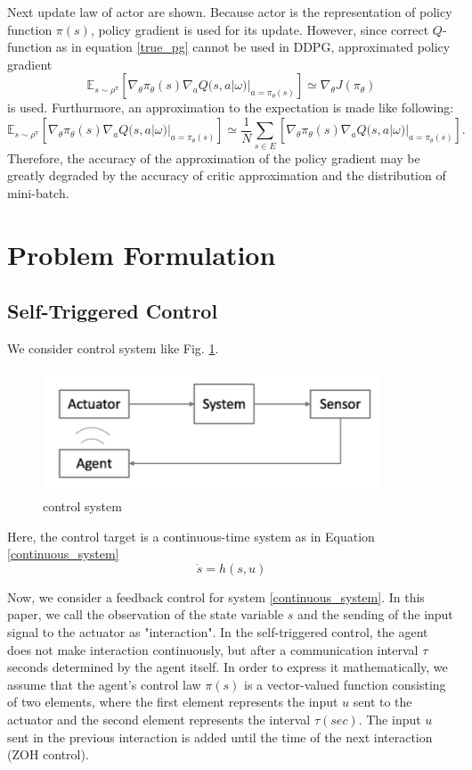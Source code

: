 \documentclass[english, dvipdfmx]{ampmt}             %
\newcommand{\expect}{\mathbb{E}}
\begin{document}
Next update law of actor are shown. Because actor is the representation of policy function $\pi(s)$, policy gradient is used for its update. However, since correct $Q$-function as in equation \eqref{true_pg} cannot be used in DDPG, approximated policy gradient
\begin{equation}
	\expect_{s\sim\rho^{\pi}}[\nabla_{\theta}\pi_{\theta}(s)\nabla_{a}Q(s, a|\omega)|_{a=\pi_{\theta}(s)}] \simeq \nabla_{\theta}J(\pi_{\theta}) 
\end{equation}
 is used. Furthurmore, an approximation to the expectation is made like following:
 \begin{equation}
	\expect_{s\sim\rho^{\pi}}[\nabla_{\theta}\pi_{\theta}(s)\nabla_{a}Q(s, a|\omega)|_{a=\pi_{\theta}(s)}] \simeq \frac{1}{N}\sum_{s\in E}[\nabla_{\theta}\pi_{\theta}(s)\nabla_{a}Q(s, a|\omega)|_{a=\pi_{\theta}(s)}]. \label{expectation_approximation}
\end{equation}
Therefore, the accuracy of the approximation of the policy gradient may be greatly degraded by the accuracy of critic approximation and the distribution of mini-batch.


\section{Problem Formulation}
\subsection{Self-Triggered Control}
We consider control system like Fig. \ref{image}.
\begin{figure}[h]
	\centering
 	\includegraphics[width=10cm]{event.png}
 	\caption{control system} \label{image}
\end{figure}
Here, the control target is a continuous-time system as in Equation \eqref{continuous_system}
\begin{equation}
	\dot{s} = h(s,u) \label{continuous_system}
\end{equation}\par
Now, we consider a feedback control for system \eqref{continuous_system}. In this paper, we call the observation of the state variable $s$ and the sending of the input signal to the actuator as "interaction". In the self-triggered control, the agent does not make interaction continuously, but after a communication interval $\tau$ seconds determined by the agent itself. In order to express it mathematically, we assume that the agent's control law $\pi(s)$ is a vector-valued function consisting of two elements, where the first element represents the input $u$ sent to the actuator and the second element represents the interval $\tau (sec)$. The input $u$ sent in the previous interaction is added until the time of the next interaction (ZOH control).
\end{document}
